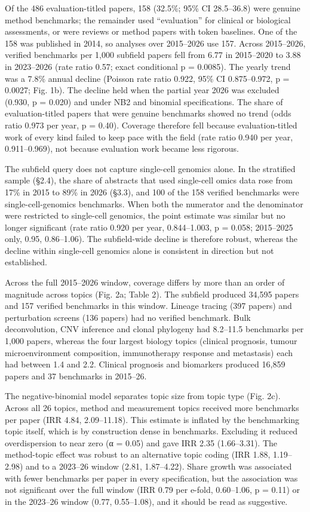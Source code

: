 \documentclass[11pt]{article}
\begin{document}
Of the 486 evaluation-titled papers, 158 (32.5\%; 95\% CI 28.5--36.8)
were genuine method benchmarks; the remainder used ``evaluation'' for
clinical or biological assessments, or were reviews or method papers
with token baselines. One of the 158 was published in 2014, so analyses over 2015--2026 use 157. Across 2015--2026, verified benchmarks per 1,000
subfield papers fell from 6.77 in 2015--2020 to 3.88 in 2023--2026 (rate
ratio 0.57; exact conditional p = 0.0085). The yearly trend was a 7.8\%
annual decline (Poisson rate ratio 0.922, 95\% CI 0.875--0.972, p =
0.0027; Fig. 1b). The decline held when the partial year 2026 was
excluded (0.930, p = 0.020) and under NB2 and binomial specifications.
The share of evaluation-titled papers that were genuine benchmarks
showed no trend (odds ratio 0.973 per year, p = 0.40). Coverage
therefore fell because evaluation-titled work of every kind failed to
keep pace with the field (rate ratio 0.940 per year, 0.911--0.969), not
because evaluation work became less rigorous.

The subfield query does not capture single-cell genomics alone. In the
stratified sample (§2.4), the share of abstracts that used single-cell
omics data rose from 17\% in 2015 to 89\% in 2026 (§3.3), and 100 of the
158 verified benchmarks were single-cell-genomics benchmarks. When both
the numerator and the denominator were restricted to single-cell
genomics, the point estimate was similar but no longer significant (rate
ratio 0.920 per year, 0.844--1.003, p = 0.058; 2015--2025 only, 0.95,
0.86--1.06). The subfield-wide decline is therefore robust, whereas the
decline within single-cell genomics alone is consistent in direction but
not established.

Across the full 2015--2026 window, coverage differs by more than an
order of magnitude across topics (Fig. 2a; Table 2). The subfield
produced 34,595 papers and 157 verified benchmarks in this window.
Lineage tracing (397 papers) and perturbation screens (136 papers) had
no verified benchmark. Bulk deconvolution, CNV inference and clonal
phylogeny had 8.2--11.5 benchmarks per 1,000 papers, whereas the four
largest biology topics (clinical prognosis, tumour microenvironment
composition, immunotherapy response and metastasis) each had between 1.4
and 2.2. Clinical prognosis and biomarkers produced 16,859 papers and 37
benchmarks in 2015--26.

The negative-binomial model separates topic size from topic type (Fig.
2c). Across all 26 topics, method and measurement topics received more
benchmarks per paper (IRR 4.84, 2.09--11.18). This estimate is inflated
by the benchmarking topic itself, which is by construction dense in
benchmarks. Excluding it reduced overdispersion to near zero (α = 0.05)
and gave IRR 2.35 (1.66--3.31). The method-topic effect was robust to an
alternative topic coding (IRR 1.88, 1.19--2.98) and to a 2023--26 window
(2.81, 1.87--4.22). Share growth was associated with fewer benchmarks
per paper in every specification, but the association was not
significant over the full window (IRR 0.79 per e-fold, 0.60--1.06, p =
0.11) or in the 2023--26 window (0.77, 0.55--1.08), and it should be
read as suggestive.
\end{document}

